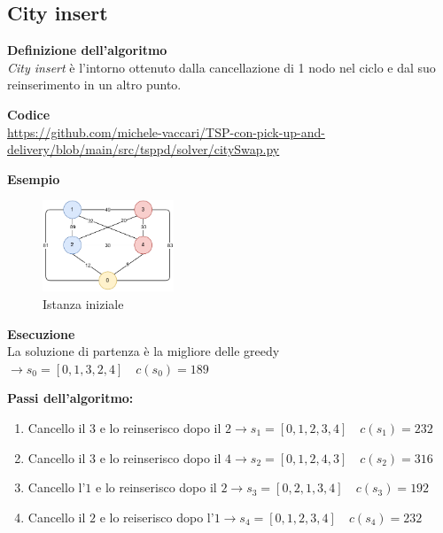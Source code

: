 \documentclass[9pt]{beamer}
\begin{document}
\subsection{City insert}
\begin{frame}[allowframebreaks]{\subsecname}
	\textbf{Definizione dell'algoritmo} \\
	\emph{City insert} è l’intorno ottenuto dalla cancellazione di 1 nodo nel ciclo e dal suo reinserimento in un altro punto.

	\textbf{Codice} \\
	\href{https://github.com/michele-vaccari/TSP-con-pick-up-and-delivery/blob/main/src/tsppd/solver/citySwap.py}{https://github.com/michele-vaccari/TSP-con-pick-up-and-delivery/blob/main/src/tsppd/solver/citySwap.py}

	\textbf{Esempio}
	\begin{figure}[h]
	\centering
	\includegraphics[width=0.35\textwidth]
	{../images/graph-tsppd-with-two-customers}	
	\caption{Istanza iniziale}
	\end{figure}

\framebreak
	{\footnotesize
	\textbf{Esecuzione} \\
	La soluzione di partenza è la migliore delle greedy $\rightarrow s_0 = [0,1,3,2,4] \quad c(s_0) = 189$

	\textbf{Passi dell’algoritmo:}
	\begin{enumerate}
		\item
		\label{city-insert-case}
		Cancello il $3$ e lo reinserisco dopo il $2 \rightarrow s_1 = [0,1,2,3,4] \quad c(s_1) = 232$
		\item
		Cancello il $3$ e lo reinserisco dopo il $4 \rightarrow s_2 = [0,1,2,4,3] \quad c(s_2) = 316$
		\item
		Cancello l’$1$ e lo reinserisco dopo il $2 \rightarrow s_3 = [0,2,1,3,4] \quad c(s_3) = 192$
		\item
		Cancello il $2$ e lo reiserisco dopo l’$1 \rightarrow s_4 = [0,1,2,3,4] \quad c(s_4) = 232$
	\end{enumerate}

	\captionsetup{justification=centering,font=footnotesize}

}
\end{frame}
\end{document}
